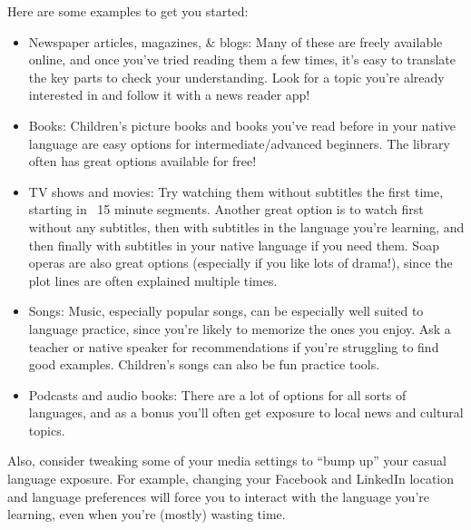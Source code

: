 \documentclass[../main.tex]{subfiles}
\begin{document}
Here are some examples to get you started:
%
\begin{itemize}
  \item Newspaper articles, magazines, \& blogs: Many of these are freely
    available online, and once you’ve tried reading them a few times, it’s easy
    to translate the key parts to check your understanding. Look for a topic
    you’re already interested in and follow it with a news reader app!
  \item Books: Children’s picture books and books you’ve read before in your
    native language are easy options for intermediate/advanced beginners. The
    library often has great options available for free!
  \item TV shows and movies: Try watching them without subtitles the first time,
    starting in ~15 minute segments. Another great option is to watch first
    without any subtitles, then with subtitles in the language you’re learning,
    and then finally with subtitles in your native language if you need them.
    Soap operas are also great options (especially if you like lots of drama!),
    since the plot lines are often explained multiple times.
  \item Songs: Music, especially popular songs, can be especially well suited to
    language practice, since you’re likely to memorize the ones you enjoy. Ask a
    teacher or native speaker for recommendations if you’re struggling to find
    good examples. Children’s songs can also be fun practice tools.
  \item Podcasts and audio books: There are a lot of options for all sorts of
    languages, and as a bonus you’ll often get exposure to local news and
    cultural topics.
\end{itemize}
%
Also, consider tweaking some of your media settings to “bump up” your casual
language exposure. For example, changing your Facebook and LinkedIn location and
language preferences will force you to interact with the language you’re
learning, even when you’re (mostly) wasting time.
%
\end{document}
